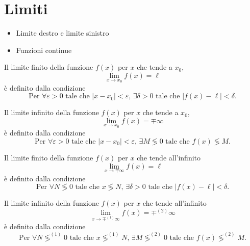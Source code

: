 \section{Limiti}
{\color{red}
\begin{itemize}
    \item Limite destro e limite sinistro
    \item Funzioni continue
\end{itemize}
}
\begin{definition} Il limite finito della funzione $f(x)$  per $x$ che tende a $x_0$,
    \begin{equation}
      \lim_{x \rightarrow x_0} f(x) = \ell
    \end{equation}
    è definito dalla condizione
    \begin{equation}
        \text{Per $\forall \varepsilon > 0$ tale che $|x-x_0| < \varepsilon$, $\exists \delta > 0$ tale che $|f(x) - \ell|< \delta$.}
    \end{equation}
\end{definition}
\begin{definition} Il limite infinito della funzione $f(x)$  per $x$ che tende a $x_0$,
    \begin{equation}
      \lim_{x \rightarrow x_0} f(x) = \mp \infty
    \end{equation}
    è definito dalla condizione
    \begin{equation}
        \text{Per $\forall \varepsilon > 0$ tale che $|x-x_0| < \varepsilon$, $\exists M \lessgtr 0$ tale che $f(x) \lessgtr M$.}
    \end{equation}
\end{definition}
\begin{definition} Il limite finito della funzione $f(x)$ per $x$ che tende all'infinito
    \begin{equation}
      \lim_{x \rightarrow \mp \infty} f(x) = \ell
    \end{equation}
    è definito dalla condizione
    \begin{equation}
        \text{Per $\forall N \lessgtr 0$ tale che $x \lessgtr  N$, $\exists \delta > 0$ tale che $|f(x) - \ell| < \delta$.}
    \end{equation}
\end{definition}
\begin{definition} Il limite infinito della funzione $f(x)$ per $x$ che tende all'infinito
    \begin{equation}
        \lim_{x \rightarrow \mp^{(1)} \infty} f(x) = \mp^{(2)} \infty
    \end{equation}
    è definito dalla condizione
    \begin{equation}
        \text{Per $\forall N \lessgtr^{(1)} 0$ tale che $x \lessgtr^{(1)} N$, $\exists M \lessgtr^{(2)} 0$ tale che $f(x) \lessgtr^{(2)} M$.}
    \end{equation}
\end{definition}

